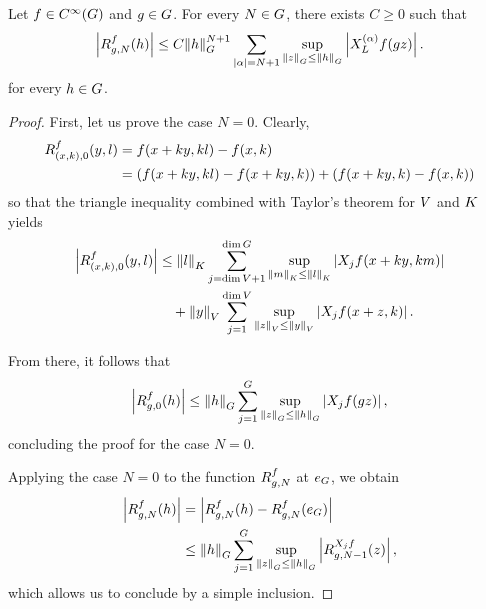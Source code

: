 \begin{proposition}
\label{proposition:Taylor_theorem}
    Let $f \in \SmoothFunctions \Group$ and $g \in \Group$.
    For every $N \in \Group$,
    there exists $C \geq 0$ such that
    \begin{align*}
        \abs {\TaylorRemainder f g N (h)}
        \leq
        C \norm [\Group] h^{N + 1}
        \sum_{\abs \alpha = N + 1}
        \sup_{\norm [\Group] z \leq \norm [\Group] h}
        \abs {\TaylorLeftDifferentialOperator \alpha f(g z)}.
    \end{align*}
    for every $h \in \Group$.
\end{proposition}
\begin{proof}
    First, let us prove the case $N = 0$.
    Clearly,
    \begin{align*}
        \TaylorRemainder f {(x, k)} 0 (y, l)
        &= f(x + ky, k l) - f(x, k)\\
        &=
        (f(x + ky, k l) - f(x + ky, k))
        + (f(x + ky, k) - f(x, k))
    \end{align*}
    so that the triangle inequality combined
    with Taylor's theorem for $\VectorSpace$ and $\CompactGroup$ yields
    \begin{align*}
        \abs {\TaylorRemainder f {(x, k)} 0 (y, l)}
        &\leq
        \norm [\CompactGroup] l
        \sum_{j = \dim \VectorSpace + 1}^{\dim \Group}
        \sup_{\norm [\CompactGroup] m \leq \norm [\CompactGroup] l}
        \abs {\LeftDifferentialOperatorFirstOrder {X_j} f(x + k y, k m)}\\
        &\quad +
        \norm {y}
        \sum_{j = 1}^{\dim \VectorSpace}
        \sup_{\norm {z} \leq \norm {y}}
        \abs {\LeftDifferentialOperatorFirstOrder {X_j} f(x + z, k)}.
    \end{align*}

    From there,
    it follows that
    \begin{align*}
        \abs {\TaylorRemainder f g 0 (h)}
        \leq
        \norm [\Group] h
        \sum_{j = 1}^{\Group}
        \sup_{\norm [\Group] z \leq \norm [\Group] h}
        \abs {\LeftDifferentialOperatorFirstOrder {X_j} f(gz)},
    \end{align*}
    concluding the proof for the case $N = 0$.

    Applying the case $N = 0$ to the function $\TaylorRemainder f g N$ at $e_\Group$,
    we obtain
    \begin{align*}
        \abs {\TaylorRemainder f g N (h)}
        &= \abs {\TaylorRemainder f g N (h) - \TaylorRemainder f g N (e_\Group)}\\
        &\leq
        \norm [\Group] h
        \sum_{j = 1}^{\Group}
        \sup_{\norm [\Group] z \leq \norm [\Group] h}
        \abs {\TaylorRemainder {\LeftDifferentialOperatorFirstOrder {X_j} f} g {N - 1}(z)},
    \end{align*}
    which allows us to conclude by a simple inclusion.
\end{proof}
